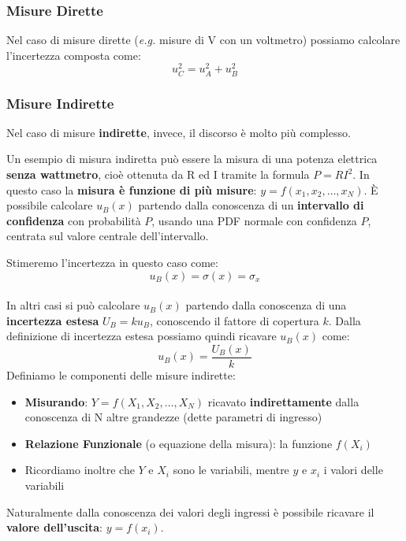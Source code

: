 \documentclass[a4paper,11pt]{report}
\begin{document}
\subsubsection{Misure Dirette}
Nel caso di misure dirette (\textit{e.g.} misure di V con un voltmetro) possiamo calcolare l'incertezza composta come:
$$
  u^2_C = u^2_A + u^2_B
$$
\subsubsection{Misure Indirette}
Nel caso di misure \textbf{indirette}, invece, il discorso è molto più complesso.

Un esempio di misura indiretta può essere la misura di una potenza elettrica \textbf{senza wattmetro}, cioè ottenuta da R ed I tramite la formula $P = RI^2$. In questo caso la \textbf{misura è funzione di più misure}: $y = f(x_1,x_2,\ldots ,x_N)$.
È possibile calcolare $u_B(x)$ partendo dalla conoscenza di un \textbf{ intervallo di confidenza} con probabilità $P$, usando una PDF normale con confidenza $P$, centrata sul valore centrale dell'intervallo.

Stimeremo l'incertezza in questo caso come:
$$
  u_B(x) = \sigma(x) = \sigma_x
$$\\

In altri casi si può calcolare $u_B(x)$ partendo dalla conoscenza di una \textbf{incertezza estesa} $U_B = k u_B$, conoscendo il fattore di copertura $k$. Dalla definizione di incertezza estesa possiamo quindi ricavare $u_B(x)$ come:
$$
  u_B(x) = \frac{U_B(x)}{k}
$$
Definiamo le componenti delle misure indirette:
\begin{itemize}
  \item \textbf{Misurando}: $Y = f(X_1,X_2,\ldots,X_N)$ ricavato \textbf{indirettamente} dalla conoscenza di N altre grandezze (dette parametri di ingresso)
  \item \textbf{Relazione Funzionale} (o equazione della misura): la funzione $f(X_i)$
  \item Ricordiamo inoltre che $Y$ e $X_i$ sono le variabili, mentre $y$ e $x_i$ i valori delle variabili
\end{itemize}
Naturalmente dalla conoscenza dei valori degli ingressi è possibile ricavare il \textbf{valore dell'uscita}: $y = f(x_i)$.
\end{document}
